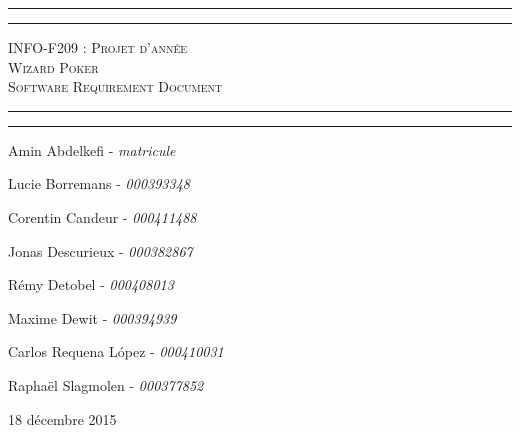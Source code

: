 \begin{titlepage}

\begin{center}
    \vspace*{\fill}
        \hrule
        \vspace*{2pt}
        \hrule
        \vspace*{15pt}
        \textsc{\Huge{INFO-F209 : Projet d'année \\\vspace*{8pt}
            Wizard Poker\\\vspace*{12pt}
            Software Requirement Document}}
        \vspace*{15pt}
        \hrule
        \vspace*{2pt}
        \hrule
  \vspace*{\fill}
\end{center}
\null
\vfill

\hfill Amin Abdelkefi - \emph{matricule}

\hfill Lucie Borremans - \emph{000393348}

\hfill Corentin Candeur - \emph{000411488}

\hfill Jonas Descurieux - \emph{000382867}

\hfill Rémy Detobel - \emph{000408013}

\hfill Maxime Dewit - \emph{000394939}

\hfill Carlos Requena López - \emph{000410031}

\hfill Raphaël Slagmolen - \emph{000377852}

\large 18 décembre 2015

\end{titlepage}
